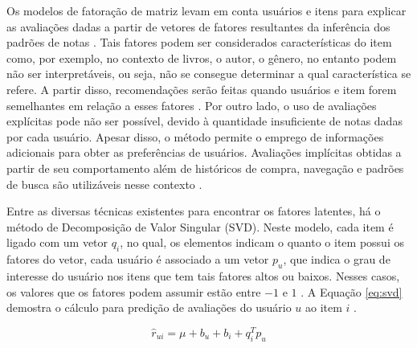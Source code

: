         Os modelos de fatoração de matriz levam em conta usuários e itens para explicar as avaliações dadas a partir de vetores de fatores resultantes da inferência dos padrões de notas \cite{Koren2009}. Tais fatores podem ser considerados características do item como, por exemplo, no contexto de livros, o autor, o gênero, no entanto podem não ser interpretáveis, ou seja, não se consegue determinar a qual característica se refere. A partir disso, recomendações serão feitas quando usuários e item forem semelhantes em relação a esses fatores \cite{Jannach2010}. Por outro lado, o uso de avaliações explícitas pode não ser possível, devido à quantidade insuficiente de notas dadas por cada usuário. Apesar disso, o método permite o emprego de informações adicionais para obter as preferências de usuários. Avaliações implícitas obtidas a partir de seu comportamento além de históricos de compra, navegação e padrões de busca são utilizáveis nesse contexto \cite{Koren2009}. 
        
        
        
                
        Entre as diversas técnicas existentes para encontrar os fatores latentes, há o método de Decomposição de Valor Singular (SVD). Neste modelo, cada item é ligado com um vetor $q_i$, no qual, os elementos indicam o quanto o item possui os fatores do vetor, cada usuário é associado a um vetor $p_u$, que indica o grau de interesse do usuário nos itens que tem tais fatores altos ou baixos. Nesses casos, os valores que os fatores podem assumir estão entre $-1$ e $1$ .  A Equação \ref{eq:svd} demostra o cálculo para predição de avaliações do usuário $u$ ao item $i$ \cite{Ricci2010}.
        
        \begin{equation}
            \hat{r}_{ui} = \mu +b_u +b_i + q^T_ip_u  \label{eq:svd}
        \end{equation}
        
